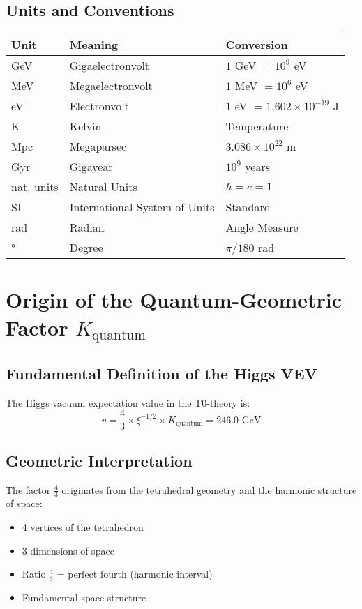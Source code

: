 \documentclass[12pt,a4paper]{article}
\begin{document}
	\subsection{Units and Conventions}
	
	\begin{longtable}{lll}
		\toprule
		\textbf{Unit} & \textbf{Meaning} & \textbf{Conversion} \\
		\midrule
		GeV & Gigaelectronvolt & $1$ GeV $= 10^9$ eV \\
		MeV & Megaelectronvolt & $1$ MeV $= 10^6$ eV \\
		eV & Electronvolt & $1$ eV $= 1.602 \times 10^{-19}$ J \\
		K & Kelvin & Temperature \\
		Mpc & Megaparsec & $3.086 \times 10^{22}$ m \\
		Gyr & Gigayear & $10^9$ years \\
		nat. units & Natural Units & $\hbar = c = 1$ \\
		SI & International System of Units & Standard \\
		rad & Radian & Angle Measure \\
		° & Degree & $\pi/180$ rad \\
		\bottomrule
	\end{longtable}
	
	\section{Origin of the Quantum-Geometric Factor $K_{\text{quantum}}$}
	
	\subsection{Fundamental Definition of the Higgs VEV}
	
	The Higgs vacuum expectation value in the T0-theory is:
	\begin{equation}
		v = \frac{4}{3} \times \xi^{-1/2} \times K_{\text{quantum}} = 246.0 \text{ GeV}
	\end{equation}
	
	\subsection{Geometric Interpretation}
	
	The factor $\frac{4}{3}$ originates from the tetrahedral geometry and the harmonic structure of space:
	\begin{itemize}
		\item 4 vertices of the tetrahedron
		\item 3 dimensions of space
		\item Ratio $\frac{4}{3}$ = perfect fourth (harmonic interval)
		\item Fundamental space structure
	\end{itemize}
	
\end{document}
